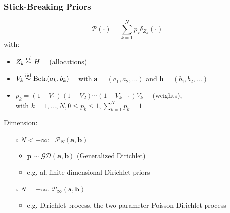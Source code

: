 	

\begin{frame}
	\frametitle{Stick-Breaking Priors}
	$$\mathscr{P}(\cdot)= \sum\limits_{k=1}^N
	\mathit{p_{k}}\delta_{Z_{k}}(\cdot)$$
	with:
	\begin{itemize}
		\item $Z_k \stackrel{\text{iid}}{\sim} H \quad$ (allocations)
		\item $V_k  \stackrel{\text{iid}}{\sim} \operatorname{Beta}(a_{k},b_{k}) \quad$ with $\mathbf{a}=(a_{1},a_{2},...)$ and $\mathbf{b}=(b_{1},b_{2},...)$
		\item $p_k = (1-V_{1}) (1-V_{2}) \cdots (1-V_{k-1}) V_k \quad$ (weights), \\[8pt] %
		with $k=1,\dots,N, 0 \leq p_k \leq 1, \sum_{k=1}^N p_k = 1$
	\end{itemize}
	Dimension:
   	\begin{itemize}
   	    \item[$\circ$] $N<+\infty$: \ $\mathscr{P}_{N}(\mathbf{a},\mathbf{b})$
   	    \begin{itemize}
   	        \item $\mathbf{p} \sim \mathscr{GD}(\mathbf{a},\mathbf{b})$ (Generalized Dirichlet)
   	        \item e.g. all finite dimensional Dirichlet priors
   	    \end{itemize}
   	    \item[$\circ$] $N=+\infty$: $\mathscr{P}_{\infty}(\mathbf{a},\mathbf{b})$
   	    \begin{itemize}
   	        \item e.g. Dirichlet process, the two-parameter Poisson-Dirichlet process
   	    \end{itemize}
   	\end{itemize}
\end{frame}


